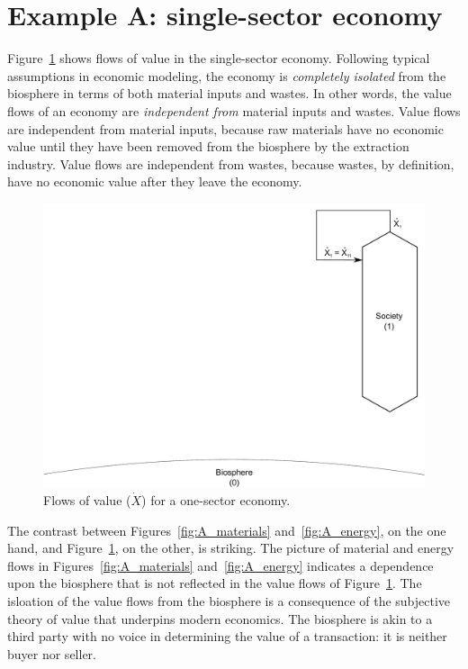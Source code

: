 \section{Example A: single-sector economy} %

Figure~\ref{fig:A_value} shows flows of value in the single-sector economy.
Following typical assumptions in economic modeling, 
the economy is \emph{completely isolated} from the biosphere
in terms of both material inputs and wastes.
In other words, the value flows of an economy are \emph{independent from}
material inputs and wastes.
Value flows are independent from material inputs,
because raw materials have no economic value 
until they have been removed from the biosphere by the extraction industry.
Value flows are independent from wastes,
because wastes, by definition, have no economic value 
after they leave the economy.

\begin{figure}[!ht]
\centering
\includegraphics[width=0.8\linewidth]{Part_2/Chapter_Values/images/1_sector_value.pdf}
\caption[Flows of value for a one-sector economy]{Flows of value ($\dot{X}$) for a one-sector economy.}
\label{fig:A_value} 
\end{figure}

The contrast between Figures~\ref{fig:A_materials} and~\ref{fig:A_energy}, 
on the one hand, 
and Figure~\ref{fig:A_value}, 
on the other, is striking.  
The picture of material and energy flows in 
Figures~\ref{fig:A_materials} and~\ref{fig:A_energy} 
indicates a dependence upon the biosphere 
that is not reflected in the value flows of Figure~\ref{fig:A_value}.
The isloation of the value flows from the biosphere is a consequence
of the subjective theory of value 
that underpins modern economics.
The biosphere is akin to a third party with no voice 
in determining the value of a transaction:
it is neither buyer nor seller. 

